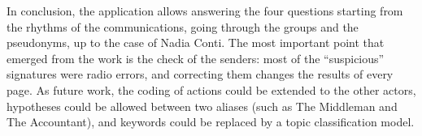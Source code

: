\documentclass[11pt,a4paper]{article}
\begin{document}
In conclusion, the application allows answering the four questions starting from the rhythms of the communications,
going through the groups and the pseudonyms, up to the case of Nadia Conti. The most important point that emerged from
the work is the check of the senders: most of the ``suspicious'' signatures were radio errors, and correcting them
changes the results of every page. As future work, the coding of actions could be extended to the other actors,
hypotheses could be allowed between two aliases (such as The Middleman and The Accountant), and keywords could be
replaced by a topic classification model.
\end{document}
